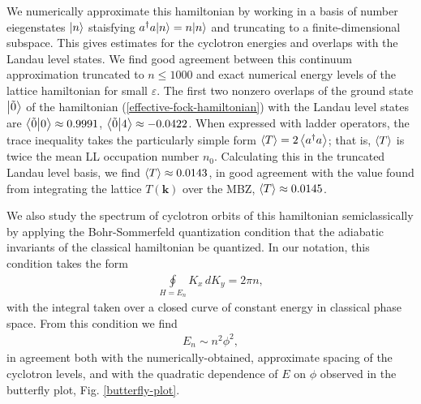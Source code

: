 \documentclass[aps,prb,twocolumn,letterpaper,twoside,nobalancelastpage,groupedaddress,amsmath,amssymb,floatfix,citeautoscript]{revtex4-1}
\begin{document}
We numerically approximate this hamiltonian by working in a basis of number eiegenstates $\ket{n}$ staisfying $a^{\dag}a{\ket{n}}=n{\ket{n}}$ and truncating to a finite-dimensional subspace. This gives estimates for the cyclotron energies and overlaps with the Landau level states. We find good agreement between this continuum approximation truncated to $n \leq 1000$ and exact numerical energy levels of the lattice hamiltonian for small $\varepsilon$. The first two nonzero overlaps of the ground state $\ket{\tilde{0}}$ of the hamiltonian (\ref{effective-fock-hamiltonian}) with the Landau level states are $\braket{\tilde{0}}{0}\approx0.9991$, $\braket{\tilde{0}}{4}\approx-0.0422$. When expressed with ladder operators, the trace inequality takes the particularly simple form $\expval{T} = 2\expval{a^{\dag}a}$\cite{bauer_quantum_2016}; that is, $\expval{T}$ is twice the mean LL occupation number $n_0$. Calculating this in the truncated Landau level basis, we find $\expval{T} \approx0.0143$, in good agreement with the value found from integrating the lattice $T(\mathbf{k})$ over the MBZ, $\expval{T} \approx 0.0145$.

We also study the spectrum of cyclotron orbits of this hamiltonian semiclassically by applying the Bohr-Sommerfeld quantization condition that the adiabatic invariants of the classical hamiltonian be quantized. In our notation, this condition takes the form
\begin{align*}
\oint\limits_{H=E_n} K_x\, dK_y = 2\pi n,
\end{align*}
with the integral taken over a closed curve of constant energy in classical phase space. From this condition we find
\begin{align*}
E_n \sim n^2\phi^2, 
\end{align*}
in agreement both with the numerically-obtained, approximate spacing of the cyclotron levels, and with the quadratic dependence of $E$ on $\phi$ observed in the butterfly plot, Fig. \ref{butterfly-plot}.
\end{document}
